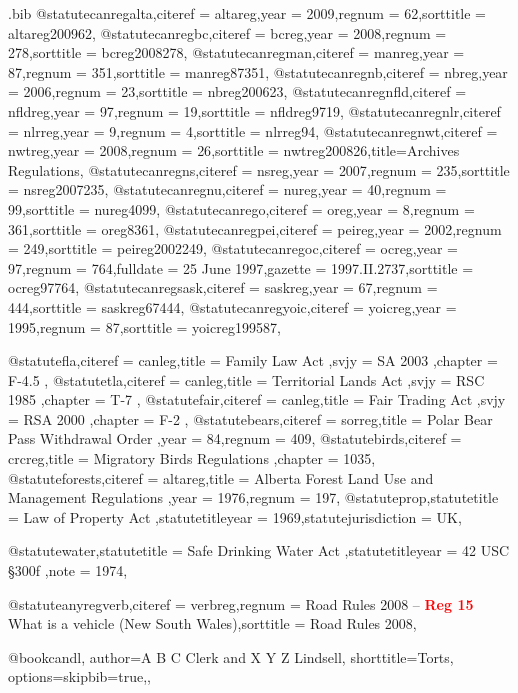 \begin{filecontents*}[overwrite]{\jobname.bib}
@statute{canregalta,citeref = {altareg},year = {2009},regnum = {62},sorttitle = {altareg200962},}
@statute{canregbc,citeref = {bcreg},year = {2008},regnum = {278},sorttitle = {bcreg2008278},}
@statute{canregman,citeref = {manreg},year = {87},regnum = {351},sorttitle = {manreg87351},}
@statute{canregnb,citeref = {nbreg},year = {2006},regnum = {23},sorttitle = {nbreg200623},}
@statute{canregnfld,citeref = {nfldreg},year = {97},regnum = {19},sorttitle = {nfldreg9719},}
@statute{canregnlr,citeref = {nlrreg},year = {9},regnum = {4},sorttitle = {nlrreg94},}
@statute{canregnwt,citeref = {nwtreg},year = {2008},regnum = {26},sorttitle = {nwtreg200826},title={Archives Regulations},}
@statute{canregns,citeref = {nsreg},year = {2007},regnum = {235},sorttitle = {nsreg2007235},}
@statute{canregnu,citeref = {nureg},year = {40},regnum = {99},sorttitle = {nureg4099},}
@statute{canrego,citeref = {oreg},year = {8},regnum = {361},sorttitle = {oreg8361},}
@statute{canregpei,citeref = {peireg},year = {2002},regnum = {249},sorttitle = {peireg2002249},}
@statute{canregoc,citeref = {ocreg},year = {97},regnum = {764},fulldate = {25 June 1997},gazette = { 1997.II.2737},sorttitle = {ocreg97764},}
@statute{canregsask,citeref = {saskreg},year = {67},regnum = {444},sorttitle = {saskreg67444},}
@statute{canregyoic,citeref = {yoicreg},year = {1995},regnum = {87},sorttitle = {yoicreg199587},}


@statute{fla,citeref = {canleg},title = {Family Law Act },svjy = {SA 2003 },chapter = {F-4.5 },}
@statute{tla,citeref = {canleg},title = {Territorial Lands Act },svjy = {RSC 1985 },chapter = {T-7 },}
@statute{fair,citeref = {canleg},title = {Fair Trading Act },svjy = {RSA 2000 },chapter = {F-2 },}
@statute{bears,citeref = {sorreg},title = {Polar Bear Pass Withdrawal Order },year = {84},regnum = {409},}
@statute{birds,citeref = {crcreg},title = {Migratory Birds Regulations },chapter = {1035},}
@statute{forests,citeref = {altareg},title = {Alberta Forest Land Use and Management Regulations },year = {1976},regnum = {197},}
@statute{prop,statutetitle = {Law of Property Act },statutetitleyear = {1969},statutejurisdiction = {UK},}

@statute{water,statutetitle = {Safe Drinking Water Act },statutetitleyear = {42 USC §300f },note = {1974},}

@statute{anyregverb,citeref = {verbreg},regnum = {Road Rules 2008 -- \textcolor{red}{\textbf{Reg 15}} What is a vehicle (New South Wales)},sorttitle = {Road Rules 2008},}

@book{candl,
author={A B C Clerk and X Y Z Lindsell},
shorttitle={Torts},
options={skipbib=true,},
}




\end{filecontents*}
